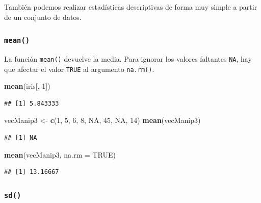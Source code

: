\documentclass[]{book}
\newenvironment{Shaded}{\begin{snugshade}}{\end{snugshade}}
\newcommand{\KeywordTok}[1]{\textcolor[rgb]{0.13,0.29,0.53}{\textbf{#1}}}
\newcommand{\DataTypeTok}[1]{\textcolor[rgb]{0.13,0.29,0.53}{#1}}
\newcommand{\DecValTok}[1]{\textcolor[rgb]{0.00,0.00,0.81}{#1}}
\newcommand{\StringTok}[1]{\textcolor[rgb]{0.31,0.60,0.02}{#1}}
\newcommand{\OtherTok}[1]{\textcolor[rgb]{0.56,0.35,0.01}{#1}}
\newcommand{\NormalTok}[1]{#1}
\begin{document}
También podemos realizar estadísticas descriptivas de forma muy simple a
partir de un conjunto de datos.

\subsubsection{\texorpdfstring{\texttt{mean()}}{mean()}}\label{l015mean}

La función \texttt{mean()} devuelve la media. Para ignorar los valores
faltantes \texttt{NA}, hay que afectar el valor \texttt{TRUE} al
argumento \texttt{na.rm()}.

\begin{Shaded}
\begin{Highlighting}[]
\KeywordTok{mean}\NormalTok{(iris[, }\DecValTok{1}\NormalTok{])}
\end{Highlighting}
\end{Shaded}

\begin{verbatim}
## [1] 5.843333
\end{verbatim}

\begin{Shaded}
\begin{Highlighting}[]
\NormalTok{vecManip3 <-}\StringTok{ }\KeywordTok{c}\NormalTok{(}\DecValTok{1}\NormalTok{, }\DecValTok{5}\NormalTok{, }\DecValTok{6}\NormalTok{, }\DecValTok{8}\NormalTok{, }\OtherTok{NA}\NormalTok{, }\DecValTok{45}\NormalTok{, }\OtherTok{NA}\NormalTok{, }\DecValTok{14}\NormalTok{)}
\KeywordTok{mean}\NormalTok{(vecManip3)}
\end{Highlighting}
\end{Shaded}

\begin{verbatim}
## [1] NA
\end{verbatim}

\begin{Shaded}
\begin{Highlighting}[]
\KeywordTok{mean}\NormalTok{(vecManip3, }\DataTypeTok{na.rm =} \OtherTok{TRUE}\NormalTok{)}
\end{Highlighting}
\end{Shaded}

\begin{verbatim}
## [1] 13.16667
\end{verbatim}

\subsubsection{\texorpdfstring{\texttt{sd()}}{sd()}}\label{l015sd}
\end{document}
